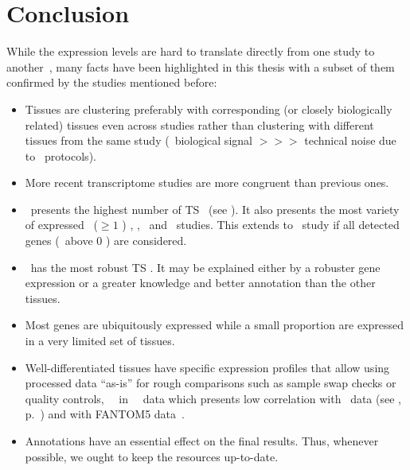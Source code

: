 \vspace{4mm}
\section{Conclusion}
While the expression levels are hard to translate directly from one study
to another~,
many facts have been highlighted in this thesis with a subset of them confirmed
by the studies mentioned before:\mybr\ %
\begin{itemize}[nosep,topsep=0pt]
        \item Tissues are clustering preferably with corresponding
            (or closely biologically related) tissues even across studies
            rather than clustering with different tissues from the same study
            (\ie\ biological signal $>>>$ technical noise due to \Rnaseq\ protocols).
        \item More recent transcriptome studies are more congruent than previous ones.
        \item \testis\ presents the highest number of \gls{TS} \pcgs\
            (see ).
            It also presents the most variety of expressed \pcgs\ ($≥1$ \FPKM)
            \castle, \brawand, \ibm\ and \uhlen\ studies.
            This extends to \gtex\ study if all detected genes (\ie\ above 0 \FPKM)
            are considered.
        \item \liver\ has the most robust \gls{TS} \pcgs.
            It may be explained either by a robuster gene expression
            or a greater knowledge and better annotation
            than the other tissues.
        \item Most genes are ubiquitously expressed while
          a small proportion are expressed in a very limited set of tissues.
        \item Well-differentiated tissues have specific expression profiles
            that allow using processed data \enquote{as-is} for rough comparisons
            such as sample swap checks
            or quality controls, \eg\ \salivary\ in \uhlen\ \etal\ data which
            presents low correlation with
            \gtex\ data (see ,
            p.~\pageref{fig:SamedistribPearsCorr}) and with
            FANTOM5 data~.
        \item Annotations have an essential effect on the final results.
              Thus, whenever possible, we ought to keep the resources up-to-date.
\end{itemize}

